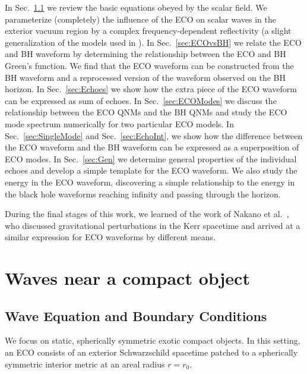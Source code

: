 \begin{refsection}
In Sec.~\ref{sec:wavebc} we review the basic equations obeyed by the scalar field. 
We parameterize (completely) the influence of the ECO on scalar waves in the exterior vacuum region by a complex frequency-dependent reflectivity (a slight generalization of the models used in \cite{Maggio:2017ivp,Hod:2017cga,Nakano:2017fvh}). 
In Sec.~\ref{sec:ECOvsBH} we relate the ECO and BH waveform by determining the relationship between the ECO and BH Green's function. 
We find that the ECO waveform can be constructed from the BH waveform and a reprocessed version of the waveform observed on the BH horizon.
In Sec.~\ref{sec:Echoes} we show how the extra piece of the ECO waveform can be expressed as sum of echoes.
In Sec.~\ref{sec:ECOModes} we discuss the relationship between the ECO QNMs and the BH QNMs and study the ECO mode spectrum numerically for two particular ECO models. In Sec.~\ref{sec:SingleMode} and Sec.~\ref{sec:EchoInt}, we show how the difference between the ECO waveform and the BH waveform can be expressed as a superposition of ECO modes. 
In Sec.~\ref{sec:Gen} we determine general properties of the individual echoes and develop a simple template for the ECO waveform.
We also study the energy in the ECO waveform, discovering a simple relationship to the energy in the black hole waveforms reaching infinity and passing through the horizon. 

During the final stages of this work, we learned of the work of Nakano et al.~\cite{Nakano:2017fvh}, who discussed gravitational perturbations in the Kerr spacetime and arrived at a similar expression for ECO waveforms by different means.

\section{Waves near a compact object}

\subsection{Wave Equation and Boundary Conditions}
\label{sec:wavebc}

We focus on static, spherically symmetric exotic compact objects.
In this setting, an ECO consists of an exterior Schwarzschild spacetime patched to a spherically symmetric interior metric at an areal radius $r=r_0$.


\end{refsection}
